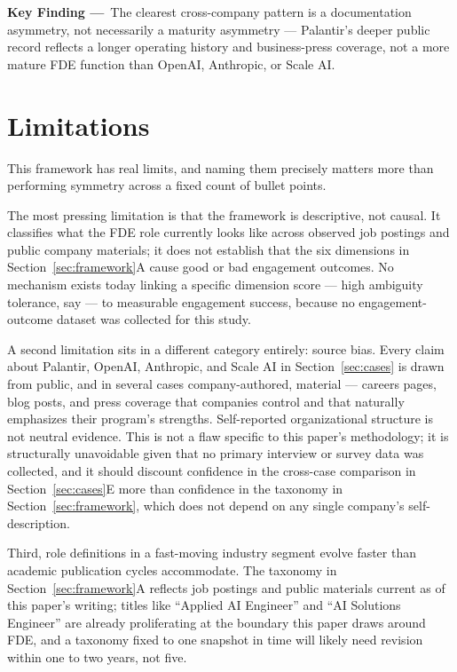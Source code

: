 \documentclass[journal]{IEEEtran}
\begin{document}
\begin{mdframed}[linecolor=tealcolor, linewidth=1.2pt, backgroundcolor=tealcolor!6,
  innerleftmargin=8pt, innerrightmargin=8pt, innertopmargin=6pt, innerbottommargin=6pt,
  roundcorner=4pt]
\noindent\textbf{\textcolor{tealcolor}{Key Finding ---}}~The clearest cross-company pattern is a documentation asymmetry, not necessarily a maturity asymmetry --- Palantir's deeper public record reflects a longer operating history and business-press coverage, not a more mature FDE function than OpenAI, Anthropic, or Scale AI.
\end{mdframed}

\section{Limitations}
\label{sec:limitations}

This framework has real limits, and naming them precisely matters more than performing symmetry across a fixed count of bullet points.

The most pressing limitation is that the framework is descriptive, not causal. It classifies what the FDE role currently looks like across observed job postings and public company materials; it does not establish that the six dimensions in Section~\ref{sec:framework}A cause good or bad engagement outcomes. No mechanism exists today linking a specific dimension score --- high ambiguity tolerance, say --- to measurable engagement success, because no engagement-outcome dataset was collected for this study.

A second limitation sits in a different category entirely: source bias. Every claim about Palantir, OpenAI, Anthropic, and Scale AI in Section~\ref{sec:cases} is drawn from public, and in several cases company-authored, material --- careers pages, blog posts, and press coverage that companies control and that naturally emphasizes their program's strengths. Self-reported organizational structure is not neutral evidence. This is not a flaw specific to this paper's methodology; it is structurally unavoidable given that no primary interview or survey data was collected, and it should discount confidence in the cross-case comparison in Section~\ref{sec:cases}E more than confidence in the taxonomy in Section~\ref{sec:framework}, which does not depend on any single company's self-description.

Third, role definitions in a fast-moving industry segment evolve faster than academic publication cycles accommodate. The taxonomy in Section~\ref{sec:framework}A reflects job postings and public materials current as of this paper's writing; titles like ``Applied AI Engineer'' and ``AI Solutions Engineer'' are already proliferating at the boundary this paper draws around FDE, and a taxonomy fixed to one snapshot in time will likely need revision within one to two years, not five.
\end{document}
